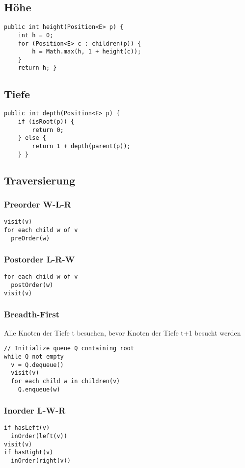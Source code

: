 \begin{multicols*}{5}
	\subsection{Höhe}
		\begin{lstlisting}
public int height(Position<E> p) {
	int h = 0;
	for (Position<E> c : children(p)) {
		h = Math.max(h, 1 + height(c));
	}
	return h; }
		\end{lstlisting}
	
	\subsection{Tiefe}
		\begin{lstlisting}
public int depth(Position<E> p) {
	if (isRoot(p)) {
		return 0;
	} else {
		return 1 + depth(parent(p));
	} }
		\end{lstlisting}
	\subsection{Traversierung}
		\subsubsection{Preorder W-L-R}
			\begin{lstlisting}
visit(v)
for each child w of v
  preOrder(w)
			\end{lstlisting}
		
		\subsubsection{Postorder L-R-W}
			\begin{lstlisting}
for each child w of v
  postOrder(w)
visit(v)
			\end{lstlisting}
		
		\subsubsection{Breadth-First}
		Alle Knoten der Tiefe t besuchen, bevor Knoten der Tiefe t+1 besucht werden
			\begin{lstlisting}
// Initialize queue Q containing root
while Q not empty
  v = Q.dequeue()
  visit(v)
  for each child w in children(v)
    Q.enqueue(w)
			\end{lstlisting}
		
		\subsubsection{Inorder L-W-R}
			\begin{lstlisting}
if hasLeft(v)
  inOrder(left(v))
visit(v)
if hasRight(v)
  inOrder(right(v))
			\end{lstlisting}


\end{multicols*}
